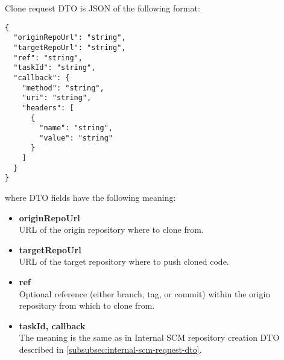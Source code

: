 \documentclass[../main.tex]{subfiles}
\begin{document}
Clone request DTO is JSON of the following format:

\begin{lstlisting}[numbers=none]
{
  "originRepoUrl": "string",
  "targetRepoUrl": "string",
  "ref": "string",
  "taskId": "string",
  "callback": {
    "method": "string",
    "uri": "string",
    "headers": [
      {
        "name": "string",
        "value": "string"
      }
    ]
  }
}
\end{lstlisting}

where DTO fields have the following meaning:
\begin{itemize}
    \item \textbf{originRepoUrl}\\
    URL of the origin repository where to clone from.

    \item \textbf{targetRepoUrl}\\
    URL of the target repository where to push cloned code.

    \item \textbf{ref}\\
    Optional reference (either branch, tag, or commit) within the origin repository from which to clone from.

    \item \textbf{taskId, callback}\\
    The meaning is the same as in Internal SCM repository creation DTO described in \ref{subsubsec:internal-scm-request-dto}.
\end{itemize}
\end{document}
